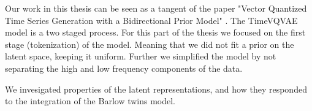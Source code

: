 \documentclass[../../thesis.tex]{subfiles}
\begin{document}

Our work in this thesis can be seen as a tangent of the paper "Vector Quantized Time Series Generation with a Bidirectional Prior Model" \cite{TimeVQVAE}. The TimeVQVAE model is a two staged process. For this part of the thesis we focused on the first stage (tokenization) of the model. Meaning that we did not fit a prior on the latent space, keeping it uniform. Further we simplified the model by not separating the high and low frequency components of the data.


We invesigated properties of the latent representations, and how they responded to the integration of the Barlow twins model. 
\end{document}
